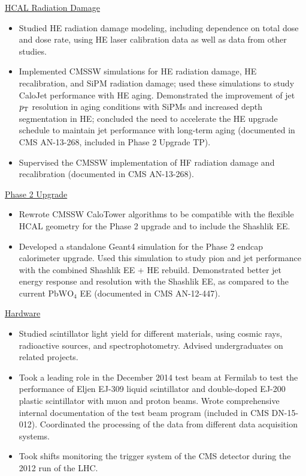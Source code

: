 \underline{HCAL Radiation Damage}
\begin{itemize}[leftmargin=12pt]
\item Studied HE radiation damage modeling, including dependence on total dose and dose rate, using HE laser calibration data as well as data from other studies.
\item Implemented CMSSW simulations for HE radiation damage, HE recalibration, and SiPM radiation damage; used these simulations to study CaloJet performance with HE aging. Demonstrated the improvement of jet $p_{\rm{T}}$ resolution in aging conditions with SiPMs and increased depth segmentation in HE; concluded the need to accelerate the HE upgrade schedule to maintain jet performance with long-term aging (documented in CMS AN-13-268, included in Phase 2 Upgrade TP).
\item Supervised the CMSSW implementation of HF radiation damage and recalibration (documented in CMS AN-13-268).
\end{itemize}
\underline{Phase 2 Upgrade}
\begin{itemize}[leftmargin=12pt]
\item Rewrote CMSSW CaloTower algorithms to be compatible with the flexible HCAL geometry for the Phase 2 upgrade and to include the Shashlik EE.
\item Developed a standalone Geant4 simulation for the Phase 2 endcap calorimeter upgrade. Used this simulation to study pion and jet performance with the combined Shashlik EE + HE rebuild. Demonstrated better jet energy response and resolution with the Shashlik EE, as compared to the current $\text{PbWO}_{4}$ EE (documented in CMS AN-12-447).
\end{itemize}
\underline{Hardware}
\begin{itemize}[leftmargin=12pt]
\item Studied scintillator light yield for different materials, using cosmic rays, radioactive sources, and spectrophotometry. Advised undergraduates on related projects.
\item Took a leading role in the December 2014 test beam at Fermilab to test the performance of Eljen EJ-309 liquid scintillator and double-doped EJ-200 plastic scintillator with muon and proton beams. Wrote comprehensive internal documentation of the test beam program (included in CMS DN-15-012). Coordinated the processing of the data from different data acquisition systems.
\item Took shifts monitoring the trigger system of the CMS detector during the 2012 run of the LHC.
\end{itemize}
